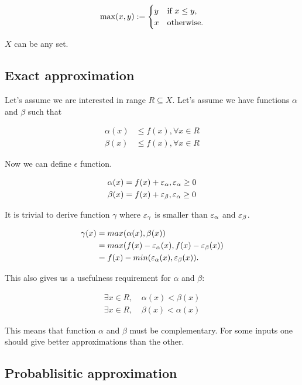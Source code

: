 \documentclass [12pt, a4]{article} %
\begin{document}
$$
\max(x,y) := \begin{cases}
    y & \text{if $x \leq y$}, \\
    x & \text{otherwise}.
\end{cases}
$$

$X$ can be any set.

\subsection{Exact approximation}

Let's assume we are interested in range $R \subseteq X$. Let's assume we 
have functions $\alpha$ and $\beta$ such that

\begin{align*}
    \alpha(x) &\leq f(x), \forall x \in R \\
    \beta(x)  &\leq f(x), \forall x \in R 
\end{align*}

Now we can define $\epsilon$ function.

\begin{align*}
    \alpha(x) &= f(x) + \varepsilon_{\alpha}, \varepsilon_{\alpha} \geq 0 \\
    \beta(x)  &= f(x) + \varepsilon_{\beta}, \varepsilon_{\alpha} \geq 0
\end{align*}

It is trivial to derive function $\gamma$ where $\varepsilon_{\gamma}$ is smaller 
than $\varepsilon_{\alpha}$ and $\varepsilon_{\beta}$.

\begin{align*}
    \gamma(x)   &= max(\alpha(x), \beta(x)) \\
                &= max(f(x) - \varepsilon_{\alpha}(x), f(x) - \varepsilon_{\beta}(x)) \\
                &= f(x) - min(\varepsilon_{\alpha}(x), \varepsilon_{\beta}(x)).
\end{align*}

This also gives us a usefulness requirement for $\alpha$ and $\beta$:

\begin{align*}
    \exists x \in R, ~ &\alpha(x) < \beta(x) \\
    \exists x \in R, ~ &\beta(x) < \alpha(x)
\end{align*}

This means that function $\alpha$ and $\beta$ must be complementary.
For some inputs one should give better approximations than the other.

\subsection{Probablisitic approximation}
\end{document}
